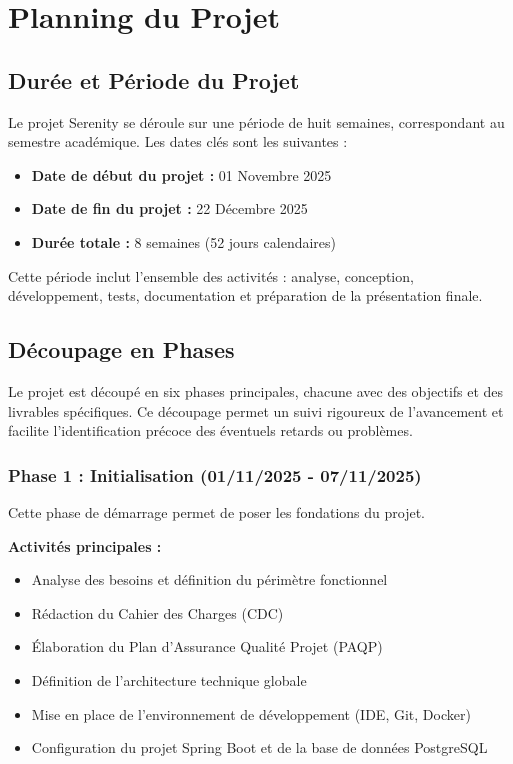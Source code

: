 \documentclass[12pt,a4paper]{report}
\begin{document}
\chapter{Planning du Projet}

\section{Durée et Période du Projet}

Le projet Serenity se déroule sur une période de huit semaines, correspondant au semestre académique. Les dates clés sont les suivantes :

\begin{itemize}
    \item \textbf{Date de début du projet :} 01 Novembre 2025
    \item \textbf{Date de fin du projet :} 22 Décembre 2025
    \item \textbf{Durée totale :} 8 semaines (52 jours calendaires)
\end{itemize}

Cette période inclut l'ensemble des activités : analyse, conception, développement, tests, documentation et préparation de la présentation finale.

\section{Découpage en Phases}

Le projet est découpé en six phases principales, chacune avec des objectifs et des livrables spécifiques. Ce découpage permet un suivi rigoureux de l'avancement et facilite l'identification précoce des éventuels retards ou problèmes.

\subsection{Phase 1 : Initialisation (01/11/2025 - 07/11/2025)}

Cette phase de démarrage permet de poser les fondations du projet.

\textbf{Activités principales :}
\begin{itemize}
    \item Analyse des besoins et définition du périmètre fonctionnel
    \item Rédaction du Cahier des Charges (CDC)
    \item Élaboration du Plan d'Assurance Qualité Projet (PAQP)
    \item Définition de l'architecture technique globale
    \item Mise en place de l'environnement de développement (IDE, Git, Docker)
    \item Configuration du projet Spring Boot et de la base de données PostgreSQL
\end{itemize}
\end{document}

